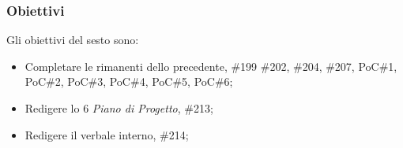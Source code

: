\subsubsection{Obiettivi}
\label{sec:sprint6_obiettivi}
Gli obiettivi del sesto  sono:
\begin{itemize}
    \item Completare le  rimanenti dello  precedente,  \#199 \#202, \#204, \#207, PoC\#1, PoC\#2, PoC\#3, PoC\#4, PoC\#5, PoC\#6;
    \item Redigere lo  6 \textit{Piano di Progetto},  \#213;
    \item Redigere il verbale interno,  \#214;
\end{itemize}